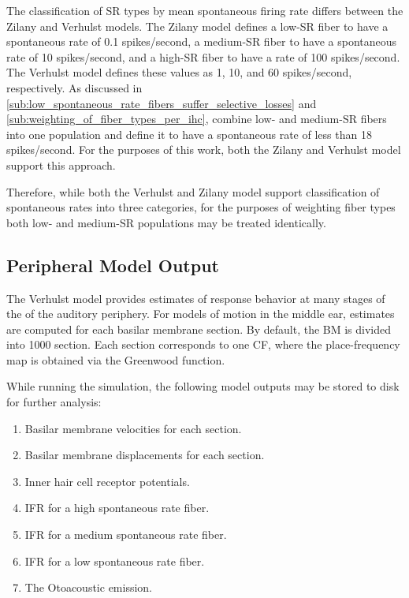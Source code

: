 The classification of SR types by mean spontaneous firing rate differs between the Zilany and Verhulst models.  The Zilany model defines a low-SR fiber to have a spontaneous rate of 0.1 spikes/second, a medium-SR fiber to have a spontaneous rate of 10 spikes/second, and a high-SR fiber to have a rate of 100 spikes/second.  The Verhulst model defines these values as 1, 10, and 60 spikes/second, respectively.  As discussed in \autoref{sub:low_spontaneous_rate_fibers_suffer_selective_losses} and \autoref{sub:weighting_of_fiber_types_per_ihc}, \cite{Temchin2008Threshold} combine low- and medium-SR fibers into one population and define it to have a spontaneous rate of less than 18 spikes/second.  For the purposes of this work, both the Zilany and Verhulst model support this approach.  

Therefore, while both the Verhulst and Zilany model support classification of spontaneous rates into three categories, for the purposes of weighting fiber types both low- and medium-SR populations may be treated identically.  


\subsection{Peripheral Model Output} %
\label{sub:peripheral_model_output}
The Verhulst model provides estimates of response behavior at many stages of the of the auditory periphery.   For models of motion in the middle ear, estimates are computed for each basilar membrane section.  By default, the BM is divided into 1000 section.  Each section corresponds to one CF, where the place-frequency map is obtained via the Greenwood function.

 While running the simulation, the following model outputs may be stored to disk for further analysis: 
\begin{enumerate}
	\item Basilar membrane velocities for each section.
	\item Basilar membrane displacements for each section.
	\item Inner hair cell receptor potentials. 
	\item IFR for a high spontaneous rate fiber.
	\item IFR for a medium spontaneous rate fiber.
	\item IFR for a low spontaneous rate fiber. 
	\item The Otoacoustic emission. 
\end{enumerate}

